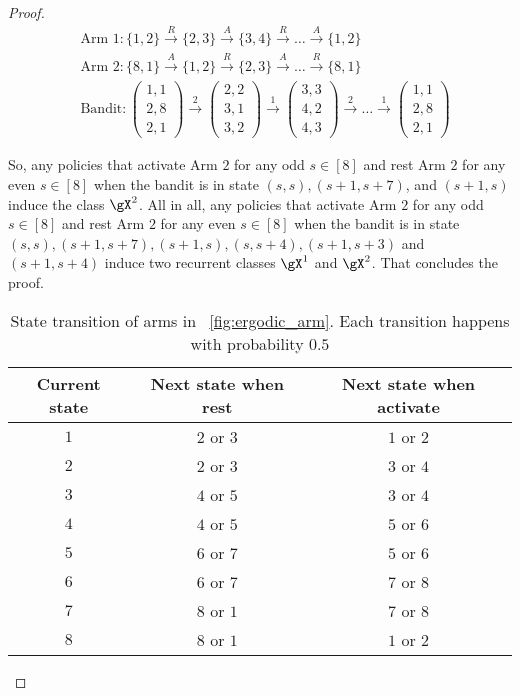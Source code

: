 \begin{proof}
    \begin{align*}
        &\text{Arm 1} : \{1,2\} \overset{R}{\to} \{2,3\} \overset{A}{\to} \{3,4\} \overset{R}{\to} \dots \overset{A}{\to} \{1,2\} \\
        &\text{Arm 2} : \{8,1\} \overset{A}{\to} \{1,2\} \overset{R}{\to} \{2,3\} \overset{A}{\to} \dots \overset{R}{\to} \{8,1\} \\
        &\text{Bandit} : \begin{pmatrix}1,1\\2,8\\2,1\end{pmatrix} \overset{2}{\to} \begin{pmatrix}2,2\\3,1\\3,2\end{pmatrix} \overset{1}{\to} \begin{pmatrix}3,3\\4,2\\4,3\end{pmatrix} \overset{2}{\to} \dots \overset{1}{\to} \begin{pmatrix}1,1\\2,8\\2,1\end{pmatrix}
    \end{align*}

    So, any policies that activate Arm $2$ for any odd $s\in[8]$ and rest Arm $2$ for any even $s\in[8]$ when the bandit is in state $(s,s), (s+1,s+7)$, and $(s+1,s)$ induce the class $\gX^2$.
    All in all, any policies that activate Arm $2$ for any odd $s\in[8]$ and rest Arm $2$ for any even $s\in[8]$ when the bandit is in state $(s,s), (s+1,s+7), (s+1,s), (s,s+4), (s+1,s+3)$ and $(s+1,s+4)$ induce two recurrent classes $\gX^1$ and $\gX^2$.
    That concludes the proof.
    \begin{table}[ht]
        \centering
        \begin{tabular}{|c|c|c|}
            \hline
            Current state & Next state when rest & Next state when activate \\\hline 
            $1$   & $2$ or $3$  &  $1$ or $2$ \\
            $2$   & $2$ or $3$  &  $3$ or $4$ \\
            $3$   & $4$ or $5$  &  $3$ or $4$ \\
            $4$   & $4$ or $5$  &  $5$ or $6$ \\
            $5$   & $6$ or $7$  &  $5$ or $6$ \\
            $6$   & $6$ or $7$  &  $7$ or $8$ \\
            $7$   & $8$ or $1$  &  $7$ or $8$ \\
            $8$   & $8$ or $1$  &  $1$ or $2$ \\ \hline
        \end{tabular}
        \caption{State transition of arms in \figurename~\ref{fig:ergodic_arm}. Each transition happens with probability $0.5$}
        \label{tab:ergodic_arm}
    \end{table}


\end{proof}
